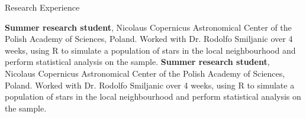 \begin{rubric}{Research Experience}



\entry*[2017 - 2018]%
    \textbf{Summer research student}, Nicolaus Copernicus Astronomical Center of the Polish Academy of Sciences, Poland. Worked with Dr. Rodolfo Smiljanic over 4 weeks, using R to simulate a population of stars in the local neighbourhood and perform statistical analysis on the sample.
\entry*[2017]%
    \textbf{Summer research student}, Nicolaus Copernicus Astronomical Center of the Polish Academy of Sciences, Poland. Worked with Dr. Rodolfo Smiljanic over 4 weeks, using R to simulate a population of stars in the local neighbourhood and perform statistical analysis on the sample.


\end{rubric}